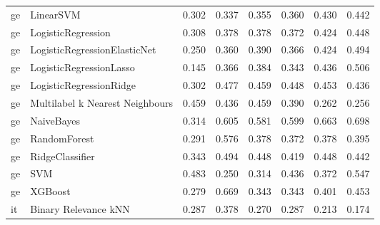 \begin{tabular}{llllllll}
      ge &                       LinearSVM & 0.302 &                     0.337 &                 0.355 &                  0.360 &                                   0.430 &     0.442 \\
      ge &              LogisticRegression & 0.308 &                     0.378 &                 0.378 &                  0.372 &                                   0.424 &     0.448 \\
      ge &    LogisticRegressionElasticNet & 0.250 &                     0.360 &                 0.390 &                  0.366 &                                   0.424 &     0.494 \\
      ge &         LogisticRegressionLasso & 0.145 &                     0.366 &                 0.384 &                  0.343 &                                   0.436 &     0.506 \\
      ge &         LogisticRegressionRidge & 0.302 &                     0.477 &                 0.459 &                  0.448 &                                   0.453 &     0.436 \\
      ge & Multilabel k Nearest Neighbours & 0.459 &                     0.436 &                 0.459 &                  0.390 &                                   0.262 &     0.256 \\
      ge &                      NaiveBayes & 0.314 &                     0.605 &                 0.581 &                  0.599 &                                   0.663 &     0.698 \\
      ge &                    RandomForest & 0.291 &                     0.576 &                 0.378 &                  0.372 &                                   0.378 &     0.395 \\
      ge &                 RidgeClassifier & 0.343 &                     0.494 &                 0.448 &                  0.419 &                                   0.448 &     0.442 \\
      ge &                             SVM & 0.483 &                     0.250 &                 0.314 &                  0.436 &                                   0.372 &     0.547 \\
      ge &                         XGBoost & 0.279 &                     0.669 &                 0.343 &                  0.343 &                                   0.401 &     0.453 \\
      it &            Binary Relevance kNN & 0.287 &                     0.378 &                 0.270 &                  0.287 &                                   0.213 &     0.174 \\

\end{tabular}
